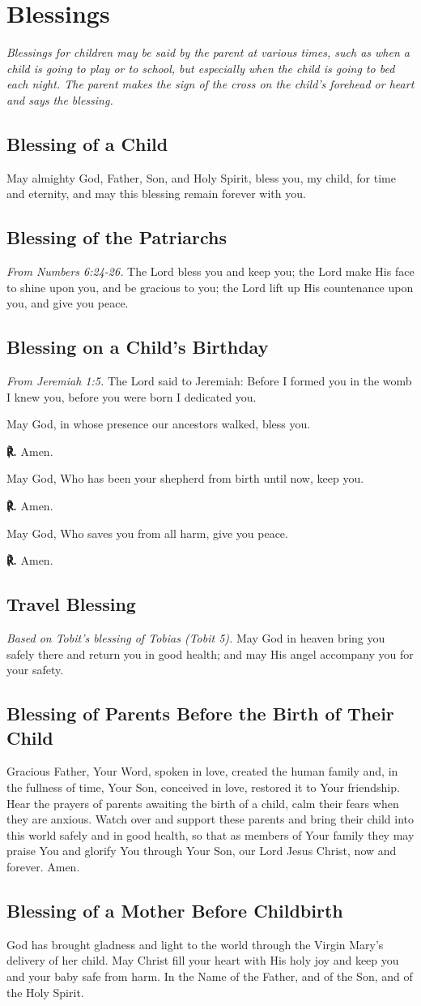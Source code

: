 \documentclass[12pt]{article}
\makeatletter
\newcommand{\prayersection}[1]{\section{#1}}
\newcommand{\prayertitle}[1]{\subsection{#1}}
\newcommand{\emphasis}[1]{\emph{#1}}
\newcommand{\emphasis}[1]{\textsl{#1}}
\newcommand{\note}[1]{{\small{\emphasis{#1}}}\newline}
\newcommand{\response}{{\setmainfont{Times New Roman}\textbf{℟.}}\xspace}
\DeclareRobustCommand{\response}{\textbf{\vers@resp{0pt}{R}.}\xspace}
\newcommand{\vers@resp@sym}{\raisebox{0.2ex}{\rotatebox[origin=c]{-20}{$\m@th\rceil$}}}
\newcommand{\vers@resp}[2]{%
		{\ooalign{\hidewidth\kern#1\vers@resp@sym\hidewidth\cr#2\cr}}%
	}
\makeatother
\begin{document}
\newpage

\prayersection{Blessings}
\note{Blessings for children may be said by the parent at various times, such as when a child is going to play or to school, but especially when the child is going to bed each night.
The parent makes the sign of the cross on the child's forehead or heart and says the blessing.}

\prayertitle{Blessing of a Child}
\label{prayer:blessing_child}
May almighty God, Father, Son, and Holy Spirit, bless you, my child, for time and eternity, and may this blessing remain forever with you.

\prayertitle{Blessing of the Patriarchs}
\label{prayer:blessing_patriarchs}
\note{From Numbers 6:24-26.}
The Lord bless you and keep you;
the Lord make His face to shine upon you, and be gracious to you;
the Lord lift up His countenance upon you, and give you peace.

\prayertitle{Blessing on a Child's Birthday}
\label{prayer:blessing_child_birthday}
\note{From Jeremiah 1:5.}
The Lord said to Jeremiah:
Before I formed you in the womb I knew you, before you were born I dedicated you.

May God, in whose presence our ancestors walked, bless you.

\response Amen.

May God, Who has been your shepherd from birth until now, keep you.

\response Amen.

May God, Who saves you from all harm, give you peace.

\response Amen.
\newpage
\prayertitle{Travel Blessing}
\label{prayer:travel_blessing}
\note{Based on Tobit's blessing of Tobias (Tobit 5).}
May God in heaven bring you safely there and return you in good health;
and may His angel accompany you for your safety.

\prayertitle{Blessing of Parents Before the Birth of Their Child}
\label{prayer:parents_before_birth_of_child}
Gracious Father, Your Word, spoken in love, created the human family and, in the fullness of time, Your Son, conceived in love, restored it to Your friendship.
Hear the prayers of parents awaiting the birth of a child, calm their fears when they are anxious.
Watch over and support these parents and bring their child into this world safely and in good health, so that as members of Your family they may praise You and glorify You through Your Son, our Lord Jesus Christ, now and forever.
Amen.

\prayertitle{Blessing of a Mother Before Childbirth}
\label{prayer:mother_before_childbirth}
God has brought gladness and light to the world through the Virgin Mary's delivery of her child.
May Christ fill your heart with His holy joy and keep you and your baby safe from harm. 
In the Name of the Father, and of the Son, and of the Holy Spirit.
\end{document}

